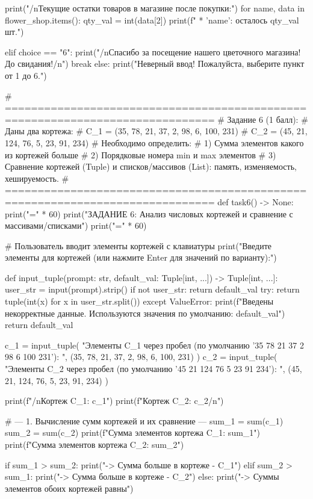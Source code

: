 \documentclass[14pt,a4paper]{extarticle}
\begin{document}
\begin{CodeListing}
            print("/nТекущие остатки товаров в магазине после покупки:")
            for name, data in flower_shop.items():
                qty_val = int(data[2])
                print(f" * '{name}': осталось {qty_val} шт.")

        elif choice == "6":
            print("/nСпасибо за посещение нашего цветочного магазина! До свидания!/n")
            break
        else:
            print("Неверный ввод! Пожалуйста, выберите пункт от 1 до 6.")


# ==============================================================================
# Задание 6 (1 балл):
# Даны два кортежа:
# C_1 = (35, 78, 21, 37, 2, 98, 6, 100, 231)
# C_2 = (45, 21, 124, 76, 5, 23, 91, 234)
# Необходимо определить:
# 1) Сумма элементов какого из кортежей больше
# 2) Порядковые номера min и max элементов
# 3) Сравнение кортежей (Tuple) и списков/массивов (List): память, изменяемость, хешируемость.
# ==============================================================================
def task6() -> None:
    print("=" * 60)
    print("ЗАДАНИЕ 6: Анализ числовых кортежей и сравнение с массивами/списками")
    print("=" * 60)

    # Пользователь вводит элементы кортежей с клавиатуры
    print("Введите элементы для кортежей (или нажмите Enter для значений по варианту):")

    def input_tuple(prompt: str, default_val: Tuple[int, ...]) -> Tuple[int, ...]:
        user_str = input(prompt).strip()
        if not user_str:
            return default_val
        try:
            return tuple(int(x) for x in user_str.split())
        except ValueError:
            print(f"Введены некорректные данные. Используются значения по умолчанию: {default_val}")
            return default_val

    c_1 = input_tuple(
        "Элементы C_1 через пробел (по умолчанию '35 78 21 37 2 98 6 100 231'): ",
        (35, 78, 21, 37, 2, 98, 6, 100, 231)
    )
    c_2 = input_tuple(
        "Элементы C_2 через пробел (по умолчанию '45 21 124 76 5 23 91 234'): ",
        (45, 21, 124, 76, 5, 23, 91, 234)
    )

    print(f"/nКортеж C_1: {c_1}")
    print(f"Кортеж C_2: {c_2}/n")

    # --- 1. Вычисление сумм кортежей и их сравнение ---
    sum_1 = sum(c_1)
    sum_2 = sum(c_2)
    print(f"Сумма элементов кортежа C_1: {sum_1}")
    print(f"Сумма элементов кортежа C_2: {sum_2}")

    if sum_1 > sum_2:
        print("-> Сумма больше в кортеже - C_1")
    elif sum_2 > sum_1:
        print("-> Сумма больше в кортеже - C_2")
    else:
        print("-> Суммы элементов обоих кортежей равны")


\end{CodeListing}
\end{document}
